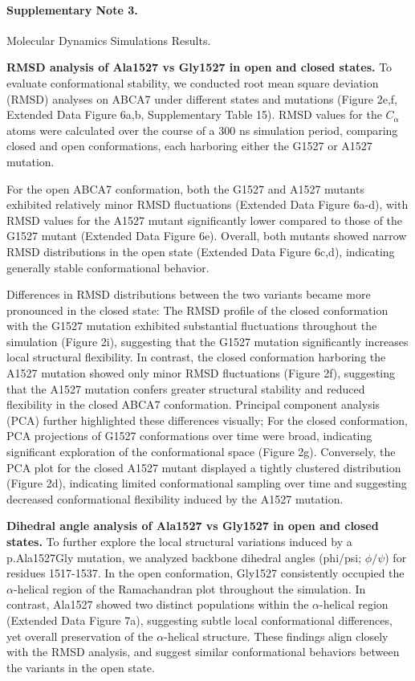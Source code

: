 \paragraph*{Supplementary Note 3.}
{}
Molecular Dynamics Simulations Results.

\textbf{RMSD analysis of Ala1527 vs Gly1527 in open and closed states.}\newline
To evaluate conformational stability, we conducted root mean square deviation (RMSD) analyses on ABCA7 under different states and mutations (Figure 2e,f, Extended Data Figure 6a,b, Supplementary Table 15). RMSD values for the $C_\alpha$ atoms were calculated over the course of a 300 ns simulation period, comparing closed and open conformations, each harboring either the G1527 or A1527 mutation.

For the open ABCA7 conformation, both the G1527 and A1527 mutants exhibited relatively minor RMSD fluctuations (Extended Data Figure 6a-d), with RMSD values for the A1527 mutant significantly lower compared to those of the G1527 mutant (Extended Data Figure 6e). Overall, both mutants showed narrow RMSD distributions in the open state (Extended Data Figure 6c,d), indicating generally stable conformational behavior. 

Differences in RMSD distributions between the two variants became more pronounced in the closed state: The RMSD profile of the closed conformation with the G1527 mutation exhibited substantial fluctuations throughout the simulation (Figure 2i), suggesting that the G1527 mutation significantly increases local structural flexibility. In contrast, the closed conformation harboring the A1527 mutation showed only minor RMSD fluctuations (Figure 2f), suggesting that the A1527 mutation confers greater structural stability and reduced flexibility in the closed ABCA7 conformation. Principal component analysis (PCA) further highlighted these differences visually; For the closed conformation, PCA projections of G1527 conformations over time were broad, indicating significant exploration of the conformational space (Figure 2g). Conversely, the PCA plot for the closed A1527 mutant displayed a tightly clustered distribution (Figure 2d), indicating limited conformational sampling over time and suggesting decreased conformational flexibility induced by the A1527 mutation.

\textbf{Dihedral angle analysis of Ala1527 vs Gly1527 in open and closed states.}\newline
To further explore the local structural variations induced by a p.Ala1527Gly mutation, we analyzed backbone dihedral angles (phi/psi; $\phi/\psi$) for residues 1517-1537. In the open conformation, Gly1527 consistently occupied the $\alpha$-helical region of the Ramachandran plot throughout the simulation. In contrast, Ala1527 showed two distinct populations within the $\alpha$-helical region (Extended Data Figure 7a), suggesting subtle local conformational differences, yet overall preservation of the $\alpha$-helical structure. These findings align closely with the RMSD analysis, and suggest similar conformational behaviors between the variants in the open state.

